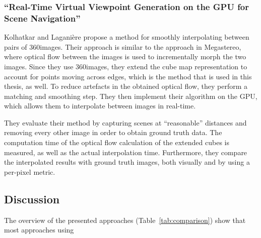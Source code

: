 

\subsubsection{``Real-Time Virtual Viewpoint Generation on the GPU for Scene Navigation'' \cite{360flowblending}}
Kolhatkar and Lagani\`ere \cite{360flowblending} propose a method for smoothly interpolating between pairs of 360\degree images.
Their approach is similar to the approach in Megastereo, where optical flow between the images is used to incrementally morph the two images. Since they use 360\degree images, they extend the cube map representation to account for points moving across edges, which is the method that is used in this thesis, as well. To reduce artefacts in the obtained optical flow, they perform a matching and smoothing step. They then implement their algorithm on the GPU, which allows them to interpolate between images in real-time. 

They evaluate their method by capturing scenes at ``reasonable'' distances and removing every other image in order to obtain ground truth data. The computation time of the optical flow calculation of the extended cubes is measured, as well as the actual interpolation time. Furthermore, they compare the interpolated results with ground truth images, both visually and by using a per-pixel metric.

\subsection{Discussion}
The overview of the presented approaches (Table~\ref{tab:comparison}) show that most approaches using 

